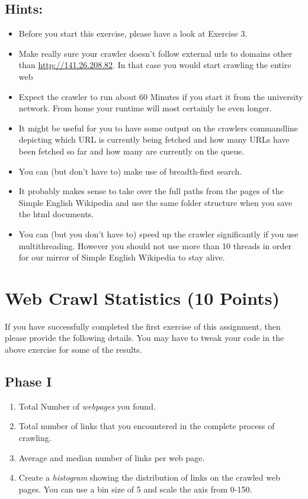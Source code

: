 \documentclass{WeSTassignment}
\begin{document}
\subsection{Hints:}
\begin{itemize}
\item Before you start this exercise, please have a look at Exercise 3. 
\item Make really sure your crawler doesn't follow external urls to domains other than \mbox{\url{http://141.26.208.82}}. In that case you would start crawling the entire web
\item Expect the crawler to run about 60 Minutes if you start it from the university network. From home your runtime will most certainly be even longer.
\item It might be useful for you to have some output on the crawlers commandline depicting which URL is currently being fetched and how many URLs have been fetched so far and how many are currently on the queue.
\item You can (but don't have to) make use of breadth-first search.
\item It probably makes sense to take over the full paths from the pages of the Simple English Wikipedia and use the same folder structure when you save the html documents.
\item You can (but you don't have to) speed up the crawler significantly if you use multithreading. However you should not use more than 10 threads in order for our mirror of Simple English Wikipedia to stay alive. 
\end{itemize}


\section{Web Crawl Statistics (10 Points)}

If you have successfully completed the first exercise of this assignment, then please provide the following details. You may have to tweak your code in the above exercise for some of the results. 
\subsection{Phase I}
\begin{enumerate}
\item Total Number of \emph{webpages} you found.
\item Total number of links that you encountered in the complete process of crawling.
\item Average and median number of links per web page.
\item Create a \emph{histogram} showing the distribution of links on the crawled web pages. You can use a bin size of 5 and scale the axis from 0-150.
\end{enumerate}
\end{document}
